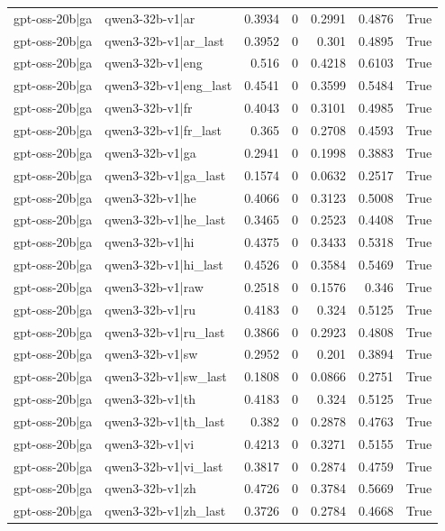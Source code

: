 \begin{table}
\begin{tabular}{l l r r r r l}
gpt-oss-20b|ga & qwen3-32b-v1|ar & 0.3934 & 0 & 0.2991 & 0.4876 & True \\
gpt-oss-20b|ga & qwen3-32b-v1|ar_last & 0.3952 & 0 & 0.301 & 0.4895 & True \\
gpt-oss-20b|ga & qwen3-32b-v1|eng & 0.516 & 0 & 0.4218 & 0.6103 & True \\
gpt-oss-20b|ga & qwen3-32b-v1|eng_last & 0.4541 & 0 & 0.3599 & 0.5484 & True \\
gpt-oss-20b|ga & qwen3-32b-v1|fr & 0.4043 & 0 & 0.3101 & 0.4985 & True \\
gpt-oss-20b|ga & qwen3-32b-v1|fr_last & 0.365 & 0 & 0.2708 & 0.4593 & True \\
gpt-oss-20b|ga & qwen3-32b-v1|ga & 0.2941 & 0 & 0.1998 & 0.3883 & True \\
gpt-oss-20b|ga & qwen3-32b-v1|ga_last & 0.1574 & 0 & 0.0632 & 0.2517 & True \\
gpt-oss-20b|ga & qwen3-32b-v1|he & 0.4066 & 0 & 0.3123 & 0.5008 & True \\
gpt-oss-20b|ga & qwen3-32b-v1|he_last & 0.3465 & 0 & 0.2523 & 0.4408 & True \\
gpt-oss-20b|ga & qwen3-32b-v1|hi & 0.4375 & 0 & 0.3433 & 0.5318 & True \\
gpt-oss-20b|ga & qwen3-32b-v1|hi_last & 0.4526 & 0 & 0.3584 & 0.5469 & True \\
gpt-oss-20b|ga & qwen3-32b-v1|raw & 0.2518 & 0 & 0.1576 & 0.346 & True \\
gpt-oss-20b|ga & qwen3-32b-v1|ru & 0.4183 & 0 & 0.324 & 0.5125 & True \\
gpt-oss-20b|ga & qwen3-32b-v1|ru_last & 0.3866 & 0 & 0.2923 & 0.4808 & True \\
gpt-oss-20b|ga & qwen3-32b-v1|sw & 0.2952 & 0 & 0.201 & 0.3894 & True \\
gpt-oss-20b|ga & qwen3-32b-v1|sw_last & 0.1808 & 0 & 0.0866 & 0.2751 & True \\
gpt-oss-20b|ga & qwen3-32b-v1|th & 0.4183 & 0 & 0.324 & 0.5125 & True \\
gpt-oss-20b|ga & qwen3-32b-v1|th_last & 0.382 & 0 & 0.2878 & 0.4763 & True \\
gpt-oss-20b|ga & qwen3-32b-v1|vi & 0.4213 & 0 & 0.3271 & 0.5155 & True \\
gpt-oss-20b|ga & qwen3-32b-v1|vi_last & 0.3817 & 0 & 0.2874 & 0.4759 & True \\
gpt-oss-20b|ga & qwen3-32b-v1|zh & 0.4726 & 0 & 0.3784 & 0.5669 & True \\
gpt-oss-20b|ga & qwen3-32b-v1|zh_last & 0.3726 & 0 & 0.2784 & 0.4668 & True \\

\end{tabular}
\end{table}
